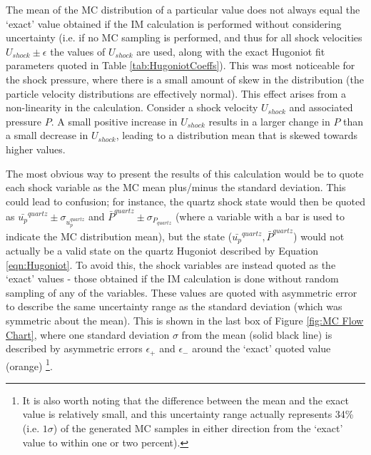 The mean of the MC distribution of a particular value does not always equal the `exact' value obtained if the IM calculation is performed without considering uncertainty (i.e. if no MC sampling is performed, and thus for all shock velocities $U_{shock} \pm \epsilon$ the values of $U_{shock}$ are used, along with the exact Hugoniot fit parameters quoted in Table \ref{tab:HugoniotCoeffs}). This was most noticeable for the shock pressure, where there is a small amount of skew in the distribution (the particle velocity distributions are effectively normal). This effect arises from a non-linearity in the calculation. Consider a shock velocity $U_{shock}$ and associated pressure $P$. A small positive increase in $U_{shock}$ results in a larger change in $P$ than a small decrease in $U_{shock}$, leading to a distribution mean that is skewed towards higher values.

The most obvious way to present the results of this calculation would be to quote each shock variable as the MC mean plus/minus the standard deviation. This could lead to confusion; for instance, the quartz shock state would then be quoted as $\bar{u_p}^{quartz} \pm \sigma_{u_p^{quartz}}$ and $\bar{P}^{quartz} \pm \sigma_{P_{quartz}}$ (where a variable with a bar is used to indicate the MC distribution mean), but the state ($\bar{u_p}^{quartz}, \bar{P}^{quartz}$) would not actually be a valid state on the quartz Hugoniot described by Equation \ref{eqn:Hugoniot}. To avoid this, the shock variables are instead quoted as the `exact' values - those obtained if the IM calculation is done without random sampling of any of the variables. These values are quoted with asymmetric error to describe the same uncertainty range as the standard deviation (which was symmetric about the mean). This is shown in the last box of Figure \ref{fig:MC Flow Chart}, where one standard deviation $\sigma$ from the mean (solid black line) is described by asymmetric errors $\epsilon_+$ and $\epsilon_-$ around the `exact' quoted value (orange) \footnote{It is also worth noting that the difference between the mean and the exact value is relatively small, and this uncertainty range actually represents 34\% (i.e. $1 \sigma$) of the generated MC samples in either direction from the `exact' value to within one or two percent).}.

